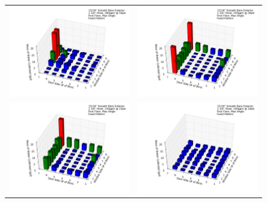 \documentclass{article}
\begin{document}
\begin{figure}[ht]
\begin{tabular*}{\textwidth}{lr}
\includegraphics[width=3.2in]{../ADD_Analysis/Figures/15-12-08_153737_Datafile_15_16in_Smooth_Bore_Exterior.png} &
\includegraphics[width=3.2in]{../ADD_Analysis/Figures/15-12-08_154306_Datafile_15_16in_Smooth_Bore_Exterior.png} \\
\includegraphics[width=3.2in]{../ADD_Analysis/Figures/15-12-08_154812_Datafile_15_16in_Smooth_Bore_Exterior.png} &
\includegraphics[width=3.2in]{../ADD_Analysis/Figures/15-12-08_155710_Datafile_15_16in_Smooth_Bore_Exterior.png} \\

\end{tabular*}
\end{figure}
\end{document}
